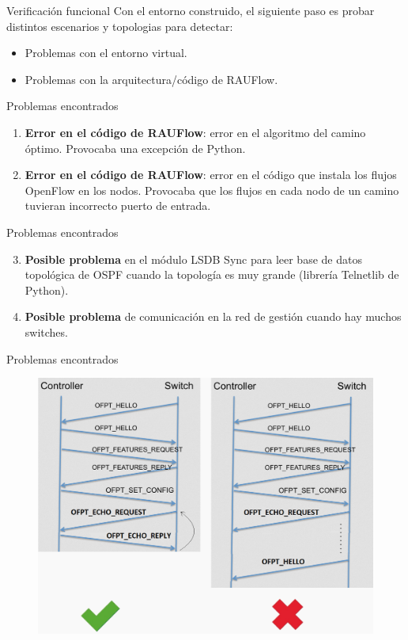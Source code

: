 \documentclass[xcolor=svgnames]{beamer}
\begin{document}
\begin{frame}{Verificación funcional}
	Con el entorno construido, el siguiente paso es probar distintos escenarios y topologias para detectar:
	\begin{itemize}
		\item Problemas con el entorno virtual.
		\item Problemas con la arquitectura/código de RAUFlow.
	\end{itemize}
\end{frame}

\begin{frame}{Problemas encontrados}
	\begin{enumerate}
		\item \textbf{Error en el código de RAUFlow}: error en el algoritmo del camino óptimo. Provocaba una excepción de Python.
		\item \textbf{Error en el código de RAUFlow}: error en el código que instala los flujos OpenFlow en los nodos. Provocaba que los flujos en cada nodo de un camino tuvieran incorrecto puerto de entrada.
	\end{enumerate}
\end{frame}

\begin{frame}{Problemas encontrados}
	\begin{enumerate}
		\setcounter{enumi}{2}
		\item \textbf{Posible problema} en el módulo LSDB Sync para leer base de datos topológica de OSPF cuando la topología es muy grande (librería Telnetlib de Python).
		\item \textbf{Posible problema} de comunicación en la red de gestión cuando hay muchos switches.
	\end{enumerate}
\end{frame}

\begin{frame}{Problemas encontrados}
	\begin{figure}[t]
		\centering
		\includegraphics[scale=0.3]{openflow_protocol_error}
	\end{figure}
\end{frame}
\end{document}
